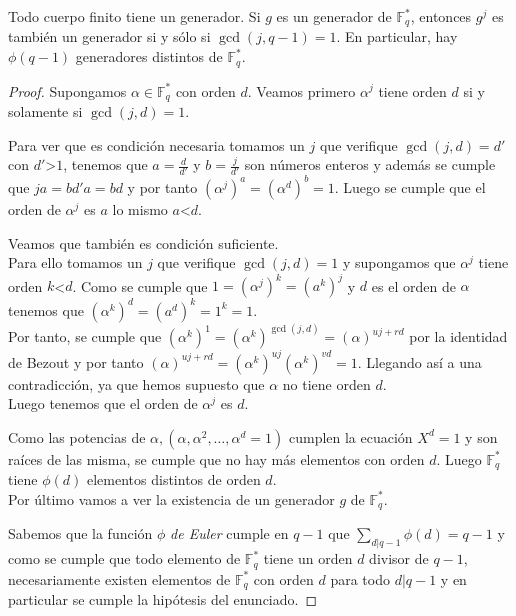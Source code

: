 \begin{teorema}
	Todo cuerpo finito tiene un generador. Si $g$ es un generador de $\mathbb{F}^{*}_q$, entonces $g^j$ es también un generador si y sólo si $\operatorname{gcd}(j,q-1)=1$. En particular, hay $\phi(q-1)$ generadores distintos de $\mathbb{F}^*_q$.
\end{teorema}
\begin{proof}
		Supongamos $\alpha \in \mathbb{F}^*_q$ con orden $d$. Veamos primero $\alpha^j$ tiene orden $d$ si y solamente si $\operatorname{gcd}(j,d)=1$.

		Para ver que es condición necesaria tomamos un $j$ que verifique $\operatorname{gcd}(j, d)=d'$ con $d'$\textgreater$ 1$, tenemos que $a=\frac{d}{d'}$ y $b=\frac{j}{d'}$ son números enteros y además se cumple que $ja=bd'a=bd$ y por tanto $(\alpha^j)^a=(\alpha^d)^b=1$. Luego se cumple que el orden de $\alpha^j$ es $a$ lo mismo $a$\textless $d$.

		Veamos que también es condición suficiente.\\ Para ello tomamos un $j$ que verifique $\operatorname{gcd}(j,d)=1$ y supongamos que $\alpha^j$ tiene orden $k$\textless $d$. Como se cumple que $1=(\alpha^j)^k=(a^k)^j$ y $d$ es el orden de $\alpha$ tenemos que $(\alpha^k)^d=(a^d)^k=1^k=1$.\\
		Por tanto, se cumple que  $(\alpha^k)^1=(\alpha^k)^{\operatorname{gcd}(j,d)}=(\alpha)^{uj+rd}$ por la identidad de Bezout y por tanto $(\alpha)^{uj+rd}=(\alpha^k)^{uj}(\alpha^k)^{vd}=1$. Llegando así a una contradicción, ya que hemos supuesto que $\alpha$ no tiene orden $d$.\\
		Luego tenemos que el orden de $\alpha^j$ es $d$.

		Como las potencias de $\alpha,(\alpha,\alpha^2,\dots,\alpha^d=1)$ cumplen la ecuación $X^d=1$ y son raíces de las misma, se cumple que no hay más elementos con orden $d$. Luego $\mathbb{F}^*_q$ tiene $\phi(d)$ elementos distintos de orden $d$.\\
		Por último vamos a ver la existencia de un generador $g$ de $\mathbb{F}_q^*$.

		Sabemos que la función $\phi$ \emph{de Euler} cumple en $q-1$ que $\sum_{d|q-1}\phi(d)=q-1$ y como se cumple que todo elemento de $\mathbb{F}^*_q$ tiene un orden $d$ divisor de $q-1$, necesariamente existen elementos de $\mathbb{F}^*_q$ con orden $d$ para todo $d|q-1$ y en particular se cumple la hipótesis del enunciado.
\end{proof}

